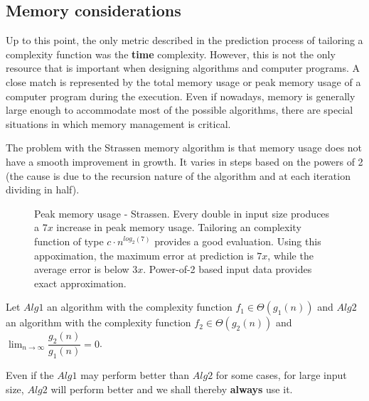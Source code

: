 \subsection{Memory considerations}

Up to this point, the only metric described in the prediction process of tailoring a complexity function was the \textbf{time} complexity. However, this is not the only resource that is important when designing algorithms and computer programs. A close match is represented by the total memory usage or peak memory usage of a computer program during the execution. Even if nowadays, memory is generally large enough to accommodate most of the possible algorithms, there are special situations in which memory management is critical.

The problem with the Strassen memory algorithm is that memory usage does not have a smooth improvement in growth. It varies in steps based on the powers of 2 (the cause is due to the recursion nature of the algorithm and at each iteration dividing in half).

\begin{figure}[H]
\caption{Peak memory usage - Strassen. Every double in input size produces a $7x$ increase in peak memory usage. Tailoring an complexity function of type $c \cdot n^{log_2(7)}$ provides a good evaluation. Using this appoximation, the maximum error at prediction is $7x$, while the average error is below $3x$.  Power-of-2 based input data provides exact approximation.}
\end{figure}

\begin{pitfall}
Let $Alg1$ an algorithm with the complexity function $f_{1} \in \Theta(g_1(n))$  and $Alg2$ an algorithm with the complexity function $f_{2} \in \Theta(g_2(n))$ and $\lim_{n\to\infty} \dfrac{g_2(n)}{g_1(n)} = 0$.

Even if the $Alg1$ may perform better than $Alg2$ for some cases, for large input size, $Alg2$ will perform better and we shall thereby \textbf{always} use it.
\end{pitfall}

